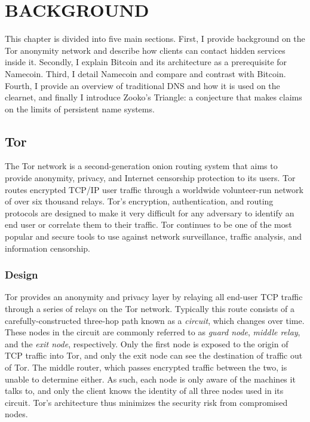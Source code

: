 
\chapter{\uppercase{Background}}

This chapter is divided into five main sections. First, I provide background on the Tor anonymity network and describe how clients can contact hidden services inside it. Secondly, I explain Bitcoin and its architecture as a prerequisite for Namecoin. Third, I detail Namecoin and compare and contrast with Bitcoin. Fourth, I provide an overview of traditional DNS and how it is used on the clearnet, and finally I introduce Zooko's Triangle: a conjecture that makes claims on the limits of persistent name systems.



\section{Tor}

The Tor network is a second-generation onion routing system that aims to provide anonymity, privacy, and Internet censorship protection to its users. Tor routes encrypted TCP/IP user traffic through a worldwide volunteer-run network of over six thousand relays. Tor's encryption, authentication, and routing protocols are designed to make it very difficult for any adversary to identify an end user or correlate them to their traffic. Tor continues to be one of the most popular and secure tools to use against network surveillance, traffic analysis, and information censorship.

\subsection{Design}

Tor provides an anonymity and privacy layer by relaying all end-user TCP traffic through a series of relays on the Tor network. Typically this route consists of a carefully-constructed three-hop path known as a \textit{circuit}, which changes over time. These nodes in the circuit are commonly referred to as \textit{guard node}, \textit{middle relay}, and the \textit{exit node}, respectively. Only the first node is exposed to the origin of TCP traffic into Tor, and only the exit node can see the destination of traffic out of Tor. The middle router, which passes encrypted traffic between the two, is unable to determine either. As such, each node is only aware of the machines it talks to, and only the client knows the identity of all three nodes used in its circuit. Tor's architecture thus minimizes the security risk from compromised nodes.\cite{McCoy2008}

